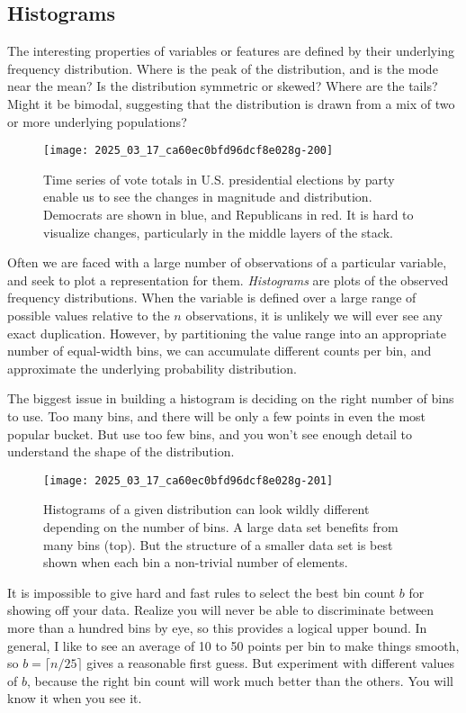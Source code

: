 \documentclass[10pt]{article}
\begin{document}
\subsection*{Histograms}
The interesting properties of variables or features are defined by their underlying frequency distribution. Where is the peak of the distribution, and is the mode near the mean? Is the distribution symmetric or skewed? Where are the tails? Might it be bimodal, suggesting that the distribution is drawn from a mix of two or more underlying populations?

\begin{figure}[H]
    \centering
    \texttt{[image: 2025\_03\_17\_ca60ec0bfd96dcf8e028g-200]}
    \caption{Time series of vote totals in U.S. presidential elections by party enable us to see the changes in magnitude and distribution. Democrats are shown in blue, and Republicans in red. It is hard to visualize changes, particularly in the middle layers of the stack.}
    \label{fig:time-series-vote-totals}
\end{figure}

Often we are faced with a large number of observations of a particular variable, and seek to plot a representation for them. \textit{Histograms} are plots of the observed frequency distributions. When the variable is defined over a large range of possible values relative to the $n$ observations, it is unlikely we will ever see any exact duplication. However, by partitioning the value range into an appropriate number of equal-width bins, we can accumulate different counts per bin, and approximate the underlying probability distribution.

The biggest issue in building a histogram is deciding on the right number of bins to use. Too many bins, and there will be only a few points in even the most popular bucket. But use too few bins, and you won't see enough detail to understand the shape of the distribution.

\begin{figure}[H]
    \centering
    \texttt{[image: 2025\_03\_17\_ca60ec0bfd96dcf8e028g-201]}
    \caption{Histograms of a given distribution can look wildly different depending on the number of bins. A large data set benefits from many bins (top). But the structure of a smaller data set is best shown when each bin a non-trivial number of elements.}
    \label{fig:histograms-bin-size}
\end{figure}

It is impossible to give hard and fast rules to select the best bin count $b$ for showing off your data. Realize you will never be able to discriminate between more than a hundred bins by eye, so this provides a logical upper bound. In general, I like to see an average of 10 to 50 points per bin to make things smooth, so $b=\lceil n / 25\rceil$ gives a reasonable first guess. But experiment with different values of $b$, because the right bin count will work much better than the others. You will know it when you see it.
\end{document}
